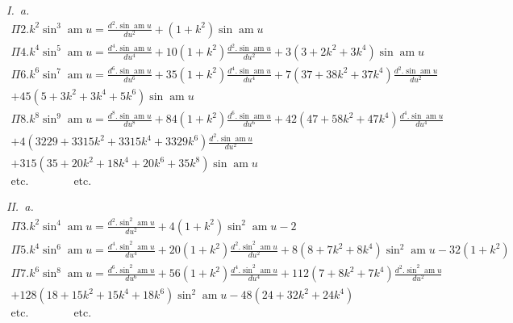 \documentclass{article}
\begin{document}
\emph{I.\ a.}
\[
\begin{gathered}
\Pi 2.k^{2}\sin^{3}\operatorname{am}u=\frac{d^{2}.\sin\operatorname{am}u}{du^{2}}+(1+k^{2})\sin\operatorname{am}u\\[1.5ex]
\Pi 4.k^{4}\sin^{5}\operatorname{am}u=\frac{d^{4}.\sin\operatorname{am}u}{du^{4}}+10(1+k^{2})\frac{d^{2}.\sin\operatorname{am}u}{du^{2}}+3(3+2k^{2}+3k^{4})\sin\operatorname{am}u\\[1.5ex]
\Pi 6.k^{6}\sin^{7}\operatorname{am}u=\frac{d^{6}.\sin\operatorname{am}u}{du^{6}}+35(1+k^{2})\frac{d^{4}.\sin\operatorname{am}u}{du^{4}}+7(37+38k^{2}+37k^{4})\frac{d^{2}.\sin\operatorname{am}u}{du^{2}}\\[1.5ex]
+45(5+3k^{2}+3k^{4}+5k^{6})\sin\operatorname{am}u\\[1.5ex]
\Pi 8.k^{8}\sin^{9}\operatorname{am}u=\frac{d^{8}.\sin\operatorname{am}u}{du^{8}}+84(1+k^{2})\frac{d^{6}.\sin\operatorname{am}u}{du^{6}}+42(47+58k^{2}+47k^{4})\frac{d^{4}.\sin\operatorname{am}u}{du^{4}}\\[1.5ex]
+4(3229+3315k^{2}+3315k^{4}+3329k^{6})\frac{d^{2}.\sin\operatorname{am}u}{du^{2}}\\[1.5ex]
+315(35+20k^{2}+18k^{4}+20k^{6}+35k^{8})\sin\operatorname{am}u\\[1.5ex]
\text{etc.}\qquad\qquad\text{etc.}
\end{gathered}
\]

\emph{II.\ a.}
\[
\begin{gathered}
\Pi 3.k^{2}\sin^{4}\operatorname{am}u=\frac{d^{2}.\sin^{2}\operatorname{am}u}{du^{2}}+4(1+k^{2})\sin^{2}\operatorname{am}u-2\\[1.5ex]
\Pi 5.k^{4}\sin^{6}\operatorname{am}u=\frac{d^{4}.\sin^{2}\operatorname{am}u}{du^{4}}+20(1+k^{2})\frac{d^{2}.\sin^{2}\operatorname{am}u}{du^{2}}+8(8+7k^{2}+8k^{4})\sin^{2}\operatorname{am}u-32(1+k^{2})\\[1.5ex]
\Pi 7.k^{6}\sin^{8}\operatorname{am}u=\frac{d^{6}.\sin^{2}\operatorname{am}u}{du^{6}}+56(1+k^{2})\frac{d^{4}.\sin^{2}\operatorname{am}u}{du^{4}}+112(7+8k^{2}+7k^{4})\frac{d^{2}.\sin^{2}\operatorname{am}u}{du^{2}}\\[1.5ex]
+128(18+15k^{2}+15k^{4}+18k^{6})\sin^{2}\operatorname{am}u-48(24+32k^{2}+24k^{4})\\[1.5ex]
\text{etc.}\qquad\qquad\text{etc.}
\end{gathered}
\]
\end{document}
